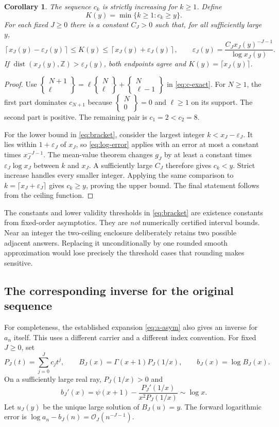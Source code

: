 \documentclass[11pt,letterpaper]{article}
\numberwithin{equation}{section}
\newtheorem{corollary}[theorem]{Corollary}
\theoremstyle{remark}\newtheorem{remark}[theorem]{Remark}
\newcommand{\Ord}{\mathcal O}
\newcommand{\stir}[2]{\left\{\begin{smallmatrix}#1\\#2\end{smallmatrix}\right\}}
\newcommand{\dist}{\operatorname{dist}}
\begin{document}
\begin{corollary}\label{cor:threshold}
The sequence $c_k$ is strictly increasing for $k\ge1$. Define
\[
 K(y)=\min\{k\ge1:c_k\ge y\}.
\]
For each fixed $J\ge0$ there is a constant $C_J>0$ such that, for all sufficiently large $y$,
\begin{equation}\label{eq:bracket}
 \left\lceil x_J(y)-\varepsilon_J(y)\right\rceil
 \le K(y)\le
 \left\lceil x_J(y)+\varepsilon_J(y)\right\rceil,
 \qquad
 \varepsilon_J(y)=\frac{C_Jx_J(y)^{-J-1}}{\log x_J(y)}.
\end{equation}
If $\dist(x_J(y),\mathbb Z)>\varepsilon_J(y)$, both endpoints agree and $K(y)=\lceil x_J(y)\rceil$.
\end{corollary}
\begin{proof}
Use $\stir{N+1}{\ell}=\ell\stir{N}{\ell}+\stir{N}{\ell-1}$ in \eqref{eq:c-exact}. For $N\ge1$, the first part dominates $c_{N+1}$ because $\stir N0=0$ and $\ell\ge1$ on its support. The second part is positive. The remaining pair is $c_1=2<c_2=8$.

For the lower bound in \eqref{eq:bracket}, consider the largest integer $k<x_J-\varepsilon_J$. It lies within $1+\varepsilon_J$ of $x_J$, so \eqref{eq:log-error} applies with an error at most a constant times $x_J^{-J-1}$. The mean-value theorem changes $g_J$ by at least a constant times $\varepsilon_J\log x_J$ between $k$ and $x_J$. A sufficiently large $C_J$ therefore gives $c_k<y$. Strict increase handles every smaller integer. Applying the same comparison to $k=\lceil x_J+\varepsilon_J\rceil$ gives $c_k\ge y$, proving the upper bound. The final statement follows from the ceiling function.
\end{proof}

The constants and lower validity thresholds in \eqref{eq:bracket} are existence constants from fixed-order asymptotics. They are \emph{not} numerically certified interval bounds. Near an integer the two-ceiling enclosure deliberately retains two possible adjacent answers. Replacing it unconditionally by one rounded smooth approximation would lose precisely the threshold cases that rounding makes sensitive.

\subsection{The corresponding inverse for the original sequence}
For completeness, the established expansion \eqref{eq:a-asym} also gives an inverse for $a_n$ itself. This uses a different carrier and a different index convention. For fixed $J\ge0$, set
\begin{equation}\label{eq:original-model}
 P_J(t)=\sum_{j=0}^{J}c_jt^j,\qquad
 B_J(x)=\Gamma(x+1)P_J(1/x),\qquad b_J(x)=\log B_J(x).
\end{equation}
On a sufficiently large real ray, $P_J(1/x)>0$ and
\[
 b_J'(x)=\psi(x+1)-\frac{P_J'(1/x)}{x^2P_J(1/x)}\sim\log x.
\]
Let $u_J(y)$ be the unique large solution of $B_J(u)=y$. The forward logarithmic error is $\log a_n-b_J(n)=\Ord_J(n^{-J-1})$.
\end{document}
